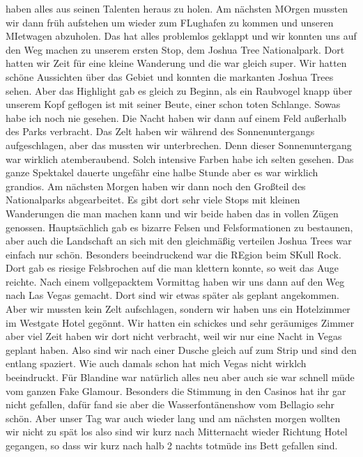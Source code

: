 \documentclass[11pt]{book}
\begin{document}
haben alles aus seinen Talenten heraus zu holen. 
Am nächsten MOrgen mussten wir dann früh aufstehen um wieder zum FLughafen zu kommen und unseren MIetwagen abzuholen. Das hat alles problemlos geklappt und 
wir konnten uns auf den Weg machen zu unserem ersten Stop, dem Joshua Tree Nationalpark. Dort hatten wir Zeit für eine kleine Wanderung und die war gleich 
super. Wir hatten schöne Aussichten über das Gebiet und konnten die markanten Joshua Trees sehen. Aber das Highlight gab es gleich zu Beginn, als ein 
Raubvogel knapp über unserem Kopf geflogen ist mit seiner Beute, einer schon toten Schlange. Sowas habe ich noch nie gesehen. Die Nacht haben wir dann 
auf einem Feld außerhalb des Parks verbracht. Das Zelt haben wir während des Sonnenuntergangs aufgeschlagen, aber das mussten wir unterbrechen. Denn dieser 
Sonnenuntergang war wirklich atemberaubend. Solch intensive Farben habe ich selten gesehen. Das ganze Spektakel dauerte ungefähr eine halbe Stunde aber es 
war wirklich grandios. Am nächsten Morgen haben wir dann noch den Großteil des Nationalparks abgearbeitet. Es gibt dort sehr viele Stops mit kleinen 
Wanderungen die man machen kann und wir beide haben das in vollen Zügen genossen. Hauptsächlich gab es bizarre Felsen und Felsformationen zu bestaunen, 
aber auch die Landschaft an sich mit den gleichmäßig verteilen Joshua Trees war einfach nur schön. Besonders beeindruckend war die REgion beim SKull Rock. 
Dort gab es riesige Felsbrochen auf die man klettern konnte, so weit das Auge reichte. Nach einem vollgepacktem Vormittag haben wir uns dann auf den Weg 
nach Las Vegas gemacht. 
Dort sind wir etwas später als geplant angekommen. Aber wir mussten kein Zelt aufschlagen, sondern wir haben uns ein Hotelzimmer im Westgate Hotel gegönnt. 
Wir hatten ein schickes und sehr geräumiges Zimmer aber viel Zeit haben wir dort nicht verbracht, weil wir nur eine Nacht in Vegas geplant haben. Also 
sind wir nach einer Dusche gleich auf zum Strip und sind den entlang spaziert. Wie auch damals schon hat mich Vegas nicht wirklch beeindruckt. Für Blandine 
war natürlich alles neu aber auch sie war schnell müde vom ganzen Fake Glamour. Besonders die Stimmung in den Casinos hat ihr gar nicht gefallen, dafür 
fand sie aber die Wasserfontänenshow vom Bellagio sehr schön. Aber unser Tag war auch wieder lang und am nächsten morgen wollten wir nicht zu spät los 
also sind wir kurz nach Mitternacht wieder Richtung Hotel gegangen, so dass wir kurz nach halb 2 nachts totmüde ins Bett gefallen sind. 
\end{document}
